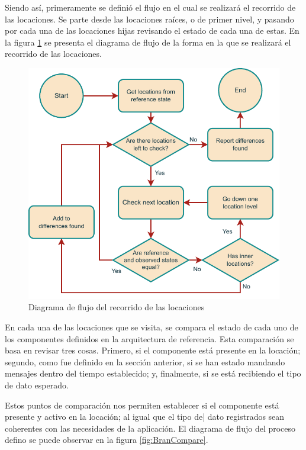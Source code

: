 Siendo así, primeramente se definió el flujo en el cual se realizará el recorrido de las locaciones. Se parte desde las locaciones raíces, o de primer nivel, y pasando por cada una de las locaciones hijas revisando el estado de cada una de estas. En la figura \ref{fig:BranProcess} se presenta el diagrama de flujo de la forma en la que se realizará el recorrido de las locaciones.

\begin{figure}[H]
    \centering
    \caption{Diagrama de flujo del recorrido de las locaciones}
    \label{fig:BranProcess}
    \includegraphics[width=0.8\linewidth]{images/BranProcess.pdf}
\end{figure}

En cada una de las locaciones que se visita, se compara el estado de cada uno de los componentes definidos en la arquitectura de referencia. Esta comparación se basa en revisar tres cosas. Primero, si el componente está presente en la locación; segundo, como fue definido en la sección anterior, si se han estado mandando mensajes dentro del tiempo establecido; y, finalmente, si se está recibiendo el tipo de dato esperado.

Estos puntos de comparación nos permiten establecer si el componente está presente y activo en la locación; al igual que el tipo de| dato registrados sean coherentes con las necesidades de la aplicación. El diagrama de flujo del proceso defino se puede observar en la figura \ref{fig:BranCompare}.

